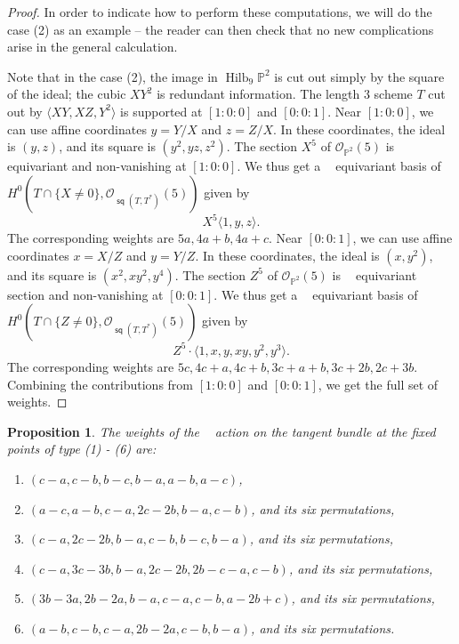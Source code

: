 \documentclass[reqno, 11pt]{amsart}
\theoremstyle{plain}
\newtheorem{proposition}[theorem]{Proposition}
\theoremstyle{remark}
\renewcommand{\P}{\mathbb{P}}
\DeclareMathOperator{\Hilb}{Hilb}
\renewcommand{\O}{\mathcal{O}}
\DeclareMathOperator{\Gm}{\mathbb{G}_{m}}
\DeclareMathOperator{\s}{\mathsf{sq}}
\begin{document}
\begin{proof}
In order to indicate how to perform these computations, we will do the case 
(2) as an example -- the reader can then check that no new complications arise in the general calculation.  

Note that in the case (2), the image in
$\Hilb_9 \P^2$ is cut out simply by the square of the ideal; the cubic
 $XY^{2}$ is redundant information.  The length $3$ scheme
$T$ cut out by $\langle XY, XZ, Y^2 \rangle$ is supported at $[1:0:0]$
and $[0:0:1]$.  Near $[1:0:0]$, we can use affine coordinates
$y = Y/X$ and $z = Z/X$.  In these coordinates, the ideal is $(y, z)$,
and its square is $(y^2, yz, z^2)$.  The section $X^5$ of
$\O_{\P^2}(5)$ is $\Gm$ equivariant and non-vanishing at $[1:0:0]$.
We thus get a $\Gm$ equivariant basis of
$H^0(T \cap \{X \neq 0\}, \O_{\s(T,T^{*})}(5))$ given by
\[ X^5 \langle 1, y, z \rangle.\] The corresponding weights are
$5a, 4a+b, 4a+c$.  Near $[0:0:1]$, we can use affine coordinates
$x = X/Z$ and $y = Y/Z$.  In these coordinates, the ideal is
$(x, y^2)$, and its square is $(x^2, xy^2, y^4)$.  The section $Z^5$
of $\O_{\P^2}(5)$ is $\Gm$ equivariant section and non-vanishing at
$[0:0:1]$.  We thus get a $\Gm$ equivariant basis of
$H^0(T \cap \{Z \neq 0\} , \O_{\s(T,T^{*})}(5))$ given by
\[ Z^5 \cdot \langle 1, x, y, xy, y^2, y^3 \rangle.\]
The corresponding weights are $5c, 4c+a, 4c+b, 3c+a+b, 3c+2b, 2c+3b$.
Combining the contributions from $[1:0:0]$ and $[0:0:1]$, we get the full set of weights.
\end{proof}

\begin{proposition}
The weights of the $\Gm$ action on the tangent bundle at the
 fixed points of type (1) - (6) are:
\begin{enumerate}
\item $(c-a, c-b, b-c, b-a, a-b, a-c)$,
\item $(a-c, a-b, c-a, 2c-2b, b-a, c-b)$, and its six permutations,
\item $(c-a, 2c-2b, b-a, c-b, b-c, b-a)$, and its six permutations,
\item $(c-a, 3c-3b, b-a, 2c-2b, 2b-c-a, c-b)$, and its six permutations,
\item $(3b-3a, 2b-2a, b-a, c-a, c-b, a-2b+c)$, and its six permutations,
\item $(a-b, c-b, c-a, 2b-2a, c-b, b-a)$, and its six permutations.
\end{enumerate}
\end{proposition}
\end{document}
